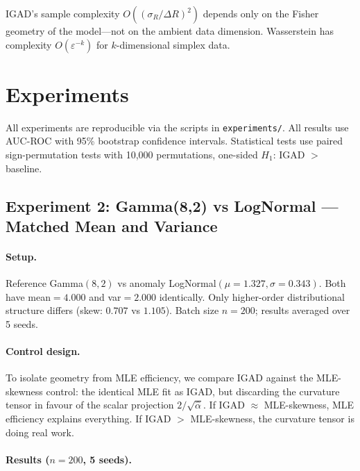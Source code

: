 \documentclass[12pt]{article}
\begin{document}
IGAD's sample complexity $O((\sigma_R/\Delta R)^2)$ depends only on the Fisher
geometry of the model---not on the ambient data dimension. Wasserstein has
complexity $O(\varepsilon^{-k})$ for $k$-dimensional simplex data.

\section{Experiments}

All experiments are reproducible via the scripts in \texttt{experiments/}. All
results use AUC-ROC with 95\% bootstrap confidence intervals. Statistical tests
use paired sign-permutation tests with 10,000 permutations, one-sided
$H_1$: IGAD $>$ baseline.

\subsection{Experiment 2: Gamma(8,2) vs LogNormal --- Matched Mean and Variance}

\paragraph{Setup.}
Reference Gamma$(8,2)$ vs anomaly LogNormal$(\mu{=}1.327,\sigma{=}0.343)$.
Both have mean$=4.000$ and var$=2.000$ identically. Only higher-order
distributional structure differs (skew: $0.707$ vs $1.105$). Batch size
$n=200$; results averaged over 5 seeds.

\paragraph{Control design.}
To isolate geometry from MLE efficiency, we compare IGAD against the
MLE-skewness control: the identical MLE fit as IGAD, but discarding the
curvature tensor in favour of the scalar projection $2/\sqrt{\hat{\alpha}}$.
If IGAD $\approx$ MLE-skewness, MLE efficiency explains everything. If
IGAD $>$ MLE-skewness, the curvature tensor is doing real work.

\paragraph{Results ($n=200$, 5 seeds).}
\end{document}

